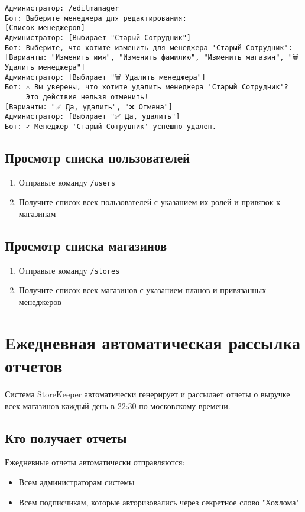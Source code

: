 \documentclass[a4paper,12pt]{article}
\begin{document}
\begin{tcolorbox}[colback=red!5, title=Пример удаления менеджера]
\begin{verbatim}
Администратор: /editmanager
Бот: Выберите менеджера для редактирования:
[Список менеджеров]
Администратор: [Выбирает "Старый Сотрудник"]
Бот: Выберите, что хотите изменить для менеджера 'Старый Сотрудник':
[Варианты: "Изменить имя", "Изменить фамилию", "Изменить магазин", "🗑 Удалить менеджера"]
Администратор: [Выбирает "🗑 Удалить менеджера"]
Бот: ⚠️ Вы уверены, что хотите удалить менеджера 'Старый Сотрудник'? 
     Это действие нельзя отменить!
[Варианты: "✅ Да, удалить", "❌ Отмена"]
Администратор: [Выбирает "✅ Да, удалить"]
Бот: ✓ Менеджер 'Старый Сотрудник' успешно удален.
\end{verbatim}
\end{tcolorbox}

\subsection{Просмотр списка пользователей}
\begin{enumerate}
    \item Отправьте команду \texttt{/users}
    \item Получите список всех пользователей с указанием их ролей и привязок к магазинам
\end{enumerate}

\subsection{Просмотр списка магазинов}
\begin{enumerate}
    \item Отправьте команду \texttt{/stores}
    \item Получите список всех магазинов с указанием планов и привязанных менеджеров
\end{enumerate}

\section{Ежедневная автоматическая рассылка отчетов}

Система StoreKeeper автоматически генерирует и рассылает отчеты о выручке всех магазинов каждый день в 22:30 по московскому времени.

\subsection{Кто получает отчеты}
Ежедневные отчеты автоматически отправляются:
\begin{itemize}
    \item Всем администраторам системы
    \item Всем подписчикам, которые авторизовались через секретное слово "Хохлома"
\end{itemize}
\end{document}
